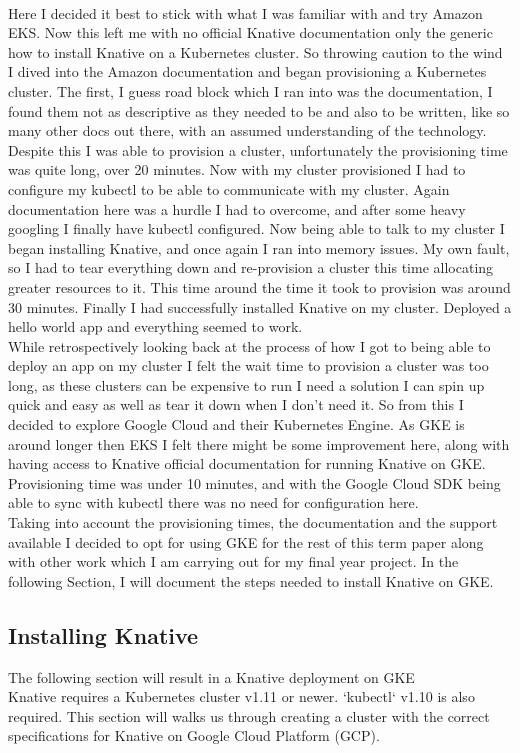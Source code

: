 \\Here I decided it best to stick with what I was familiar with and try Amazon EKS. Now this left me with no official Knative documentation only the generic how to install Knative on a Kubernetes cluster. So throwing caution to the wind I dived into the Amazon documentation and began provisioning a Kubernetes cluster. The first, I guess road block which I ran into was the documentation, I found them not as descriptive as they needed to be and also to be written, like so many other docs out there, with an assumed understanding of the technology. Despite this I was able to provision a cluster, unfortunately the provisioning time was quite long, over 20 minutes. Now with my cluster provisioned I had to configure my kubectl to be able to communicate with my cluster. Again documentation here was a hurdle I had to overcome, and after some heavy googling I finally have kubectl configured. Now being able to talk to my cluster I began installing Knative, and once again I ran into memory issues. My own fault, so I had to tear everything down and re-provision a cluster this time allocating greater resources to it. This time around the time it took to provision was around 30 minutes. Finally I had successfully installed Knative on my cluster. Deployed a hello world app and everything seemed to work.
\\While retrospectively looking back at the process of how I got to being able to deploy an app on my cluster I felt the wait time to provision a cluster was too long, as these clusters can be expensive to run I need a solution I can spin up quick and easy as well as tear it down when I don't need it. So from this I decided to explore Google Cloud and their Kubernetes Engine. As GKE is around longer then EKS I felt there might be some improvement here, along with having access to Knative official documentation for running Knative on GKE. Provisioning time was under 10 minutes, and with the Google Cloud SDK being able to sync with kubectl there was no need for configuration here. 
\\Taking into account the provisioning times, the documentation and the support available I decided to opt for using GKE for the rest of this term paper along with other work which I am carrying out for my final year project. In the following Section, I will document the steps needed to install Knative on GKE. 

\subsection{Installing Knative}
\label{sub:instk}
The following section will result in a Knative deployment on GKE
\\Knative requires a Kubernetes cluster v1.11 or newer. `kubectl` v1.10 is also
required. This section will walks us through creating a cluster with the correct
specifications for Knative on Google Cloud Platform (GCP).

